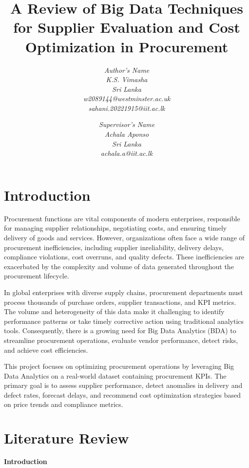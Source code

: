 \documentclass[10pt, onecolumn]{article}
\title{\textbf{A Review of Big Data Techniques for Supplier Evaluation and Cost Optimization in Procurement}}
\author{
    \fontsize{11}{13}\selectfont 
    \textit{Author's Name} \\
    \fontsize{10}{11}\selectfont 
    \textit{K.S. Vimasha}\\
    \fontsize{10}{11}\selectfont 
    \textit{Sri Lanka}\\
    \fontsize{10}{11}\selectfont
    \textit{w2089144@westminster.ac.uk}\\
    \fontsize{10}{11}\selectfont
    \textit{sahani.20221915@iit.ac.lk}\\
    \and
    \fontsize{11}{13}\selectfont 
    \textit{Supervisor's Name}\\
    \fontsize{10}{11}
    \selectfont \textit{Achala Aponso}\\
    \fontsize{10}{11}\selectfont 
    \textit{Sri Lanka}\\
    \fontsize{10}{11}\selectfont
    \textit{achala.a@iit.ac.lk} \\
}
\date{}
\begin{document}
\maketitle

\section{Introduction}

\hspace{1em}Procurement functions are vital components of modern enterprises, responsible for managing supplier relationships, negotiating costs, and ensuring timely delivery of goods and services. However, organizations often face a wide range of procurement inefficiencies, including supplier inreliability, delivery delays, compliance violations, cost overruns, and quality defects. These inefficiencies are exacerbated by the complexity and volume of data generated throughout the procurement lifecycle.

\vspace{\baselineskip}

\hspace{1em}In global enterprises with diverse supply chains, procurement departments must process thousands of purchase orders, supplier transactions, and KPI metrics. The volume and heterogeneity of this data make it challenging to identify performance patterns or take timely corrective action using traditional analytics tools. Consequently, there is a growing need for Big Data Analytics (BDA) to streamline procurement operations, evaluate vendor performance, detect risks, and achieve cost efficiencies.

\vspace{\baselineskip}

\hspace{1em}This project focuses on optimizing procurement operations by leveraging Big Data Analytics on a real-world dataset containing procurement KPIs. The primary goal is to assess supplier performance, detect anomalies in delivery and defect rates, forecast delays, and recommend cost optimization strategies based on price trends and compliance metrics.

\section{Literature Review}

\vspace{\baselineskip}
\noindent\textbf{Introduction}
\vspace{\baselineskip}
\end{document}
